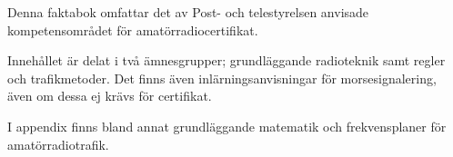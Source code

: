 Denna faktabok omfattar det av Post- och telestyrelsen anvisade
kompetensområdet för amatörradiocertifikat.

Innehållet är delat i två ämnesgrupper; grundläggande radioteknik
samt regler och trafikmetoder.
Det finns även inlärningsanvisningar för morsesignalering,
även om dessa ej krävs för certifikat.

I appendix finns bland annat grundläggande matematik
och frekvensplaner för amatörradiotrafik.
